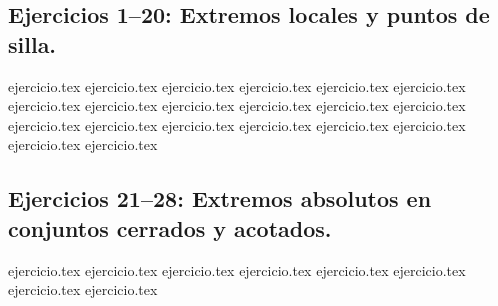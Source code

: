 
\subsection*{Ejercicios 1--20: Extremos locales y puntos de silla.}
\begin{enumerate}
    {ejercicio.tex}
    {ejercicio.tex}
    {ejercicio.tex}
    {ejercicio.tex}
    {ejercicio.tex}
    {ejercicio.tex}
    {ejercicio.tex}
    {ejercicio.tex}
    {ejercicio.tex}
    {ejercicio.tex}
    {ejercicio.tex}
    {ejercicio.tex}
    {ejercicio.tex}
    {ejercicio.tex}
    {ejercicio.tex}
    {ejercicio.tex}
    {ejercicio.tex}
    {ejercicio.tex}
    {ejercicio.tex}
    {ejercicio.tex}
\end{enumerate}

\subsection*{Ejercicios 21--28: Extremos absolutos en conjuntos cerrados y acotados.}
\begin{enumerate}
    \setcounter{enumi}{20}
    {ejercicio.tex}
    {ejercicio.tex}
    {ejercicio.tex}
    {ejercicio.tex}
    {ejercicio.tex}
    {ejercicio.tex}
    {ejercicio.tex}
    {ejercicio.tex}
\end{enumerate}

